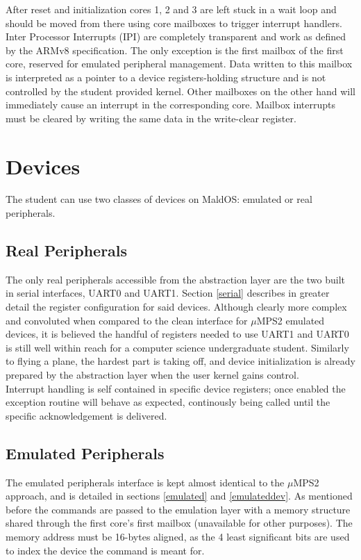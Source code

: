 \documentclass[12pt,a4paper,openright,twoside]{report}
\begin{document}
After reset and initialization cores 1, 2 and 3 are left stuck in a wait loop and
should be moved from there using core mailboxes to trigger interrupt handlers.
Inter Processor Interrupts (IPI) are completely transparent and work as defined
by the ARMv8 specification. The only exception is the first mailbox of the first
core, reserved for emulated peripheral management. Data written to this mailbox
is interpreted as a pointer to a device registers-holding structure and is not
controlled by the student provided kernel.
Other mailboxes on the other hand will immediately cause an interrupt in the
corresponding core. Mailbox interrupts must be cleared by writing the same data
in the write-clear register.

\section{Devices}
The student can use two classes of devices on MaldOS: emulated or real peripherals.

\subsection{Real Peripherals}
The only real peripherals accessible from the abstraction layer are the two 
built in serial interfaces, UART0 and UART1.
Section \ref{serial} describes in greater detail the register configuration for
said devices. Although clearly more complex and convoluted when compared to the
clean interface for $\mu$MPS2 emulated devices, it is believed the handful of 
registers needed to use UART1 and UART0 is still well within reach for a computer
science undergraduate student. Similarly to flying a plane, the hardest
part is taking off, and device initialization is already prepared by the abstraction
layer when the user kernel gains control.\\
Interrupt handling is self contained in specific device registers; once enabled
the exception routine will behave as expected, continously being called until 
the specific acknowledgement is delivered.

\subsection{Emulated Peripherals}
The emulated peripherals interface is kept almost identical to the $\mu$MPS2 
approach, and is detailed in sections \ref{emulated} and \ref{emulateddev}.
As mentioned before the commands are passed to the emulation layer with a memory
structure shared through the first core's first mailbox (unavailable for other
purposes). The memory address must be 16-bytes aligned, as the 4 least significant
bits are used to index the device the command is meant for.
\end{document}

